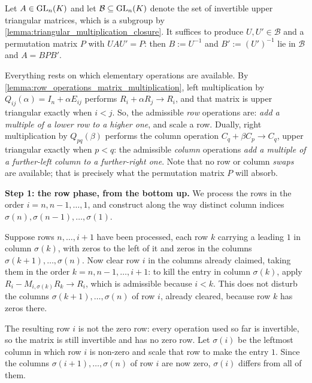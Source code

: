 \begin{exercisesolution}
\label{sol:bruhat_decomposition}
Let $A \in \operatorname{GL}_n(K)$ and let $\mathcal{B} \subseteq \operatorname{GL}_n(K)$ denote the set of invertible upper triangular matrices, which is a subgroup by \cref{lemma:triangular_multiplication_closure}. It suffices to produce $U, U' \in \mathcal{B}$ and a permutation matrix $P$ with $U A U' = P$: then $B := U^{-1}$ and $B' := (U')^{-1}$ lie in $\mathcal{B}$ and $A = B P B'$.

Everything rests on which elementary operations are available. By \cref{lemma:row_operations_matrix_multiplication}, left multiplication by $Q_{ij}(\alpha) = I_n + \alpha E_{ij}$ performs $R_i + \alpha R_j \to R_i$, and that matrix is upper triangular exactly when $i < j$. So, the admissible \emph{row} operations are: \emph{add a multiple of a lower row to a higher one}, and scale a row. Dually, right multiplication by $Q_{pq}(\beta)$ performs the column operation $C_q + \beta C_p \to C_q$, upper triangular exactly when $p < q$: the admissible \emph{column} operations \emph{add a multiple of a further-left column to a further-right one}. Note that no row or column \emph{swaps} are available; that is precisely what the permutation matrix $P$ will absorb.

\textbf{Step 1: the row phase, from the bottom up.} We process the rows in the order $i = n, n-1, \dots, 1$, and construct along the way distinct column indices $\sigma(n), \sigma(n-1), \dots, \sigma(1)$.

Suppose rows $n, \dots, i+1$ have been processed, each row $k$ carrying a leading $1$ in column $\sigma(k)$, with zeros to the left of it and zeros in the columns $\sigma(k+1), \dots, \sigma(n)$. Now clear row $i$ in the columns already claimed, taking them in the order $k = n, n-1, \dots, i+1$: to kill the entry in column $\sigma(k)$, apply $R_i - M_{i, \sigma(k)} R_k \to R_i$, which is admissible because $i < k$. This does not disturb the columns $\sigma(k+1), \dots, \sigma(n)$ of row $i$, already cleared, because row $k$ has zeros there.

The resulting row $i$ is not the zero row: every operation used so far is invertible, so the matrix is still invertible and has no zero row. Let $\sigma(i)$ be the leftmost column in which row $i$ is non-zero and scale that row to make the entry $1$. Since the columns $\sigma(i+1), \dots, \sigma(n)$ of row $i$ are now zero, $\sigma(i)$ differs from all of them.


\end{exercisesolution}
